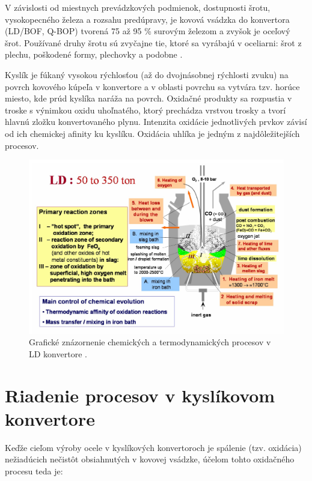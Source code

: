 \documentclass[]{tukediphc}
\begin{document}
V závislosti od miestnych prevádzkových podmienok, dostupnosti šrotu, vysokopecného železa a rozsahu predúpravy, je kovová vsádzka do konvertora (LD/BOF, Q-BOP) tvorená 75 až 95 \% surovým železom a zvyšok je oceľový šrot. Používané druhy šrotu sú zvyčajne tie, ktoré sa vyrábajú v oceliarni: šrot z plechu, poškodené formy, plechovky a podobne \cite{Turkdogan1996}.

Kyslík je fúkaný vysokou rýchlosťou (až do dvojnásobnej rýchlosti zvuku) na povrch kovového kúpeľa v konvertore a v oblasti povrchu sa vytvára tzv. horúce miesto, kde prúd kyslíka naráža na povrch. Oxidačné produkty sa rozpustia v troske s výnimkou oxidu uhoľnatého, ktorý prechádza vrstvou trosky a tvorí hlavnú zložku konvertovaného plynu. Intenzita oxidácie jednotlivých prvkov závisí od ich chemickej afinity ku kyslíku. Oxidácia uhlíka je jedným z najdôležitejších procesov.

\begin{figure}[h!]
	\centering
	\includegraphics[width=1\textwidth,angle=0]{figures/ld-convertor-processes-graphical.jpg}
	\caption{Grafické znázornenie chemických a termodynamických procesov v LD konvertore \citep{Jalkanen2006}.}
\end{figure}

\section{Riadenie procesov v kyslíkovom konvertore}

Keďže cieľom výroby ocele v kyslíkových konvertoroch je spálenie (tzv. oxidácia) nežiadúcich nečistôt obsiahnutých v kovovej vsádzke, účelom tohto oxidačného procesu teda je:
\end{document}
